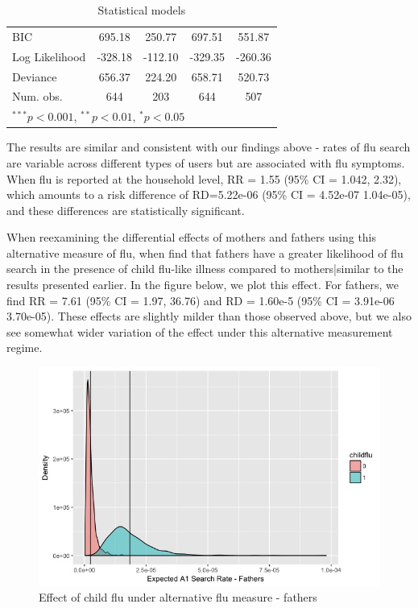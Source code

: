 \documentclass[12pt]{article}
\begin{document}
\begin{table}[h!]
\begin{center}
\begin{tabular}{l c c c c }
BIC            & 695.18         & 250.77         & 697.51         & 551.87         \\
Log Likelihood & -328.18        & -112.10        & -329.35        & -260.36        \\
Deviance       & 656.37         & 224.20         & 658.71         & 520.73         \\
Num. obs.      & 644            & 203            & 644            & 507            \\
\hline
\multicolumn{5}{l}{\scriptsize{$^{***}p<0.001$, $^{**}p<0.01$, $^*p<0.05$}}
\end{tabular}
\caption{Statistical models}
\label{table:coefficients}
\end{center}
\end{table}

The results are similar and consistent with our findings above - rates of flu search are variable across different types of users but are associated with flu symptoms. When flu is reported at the household level, RR = 1.55 (95\% CI = 1.042, 2.32), which amounts to a risk difference of RD=5.22e-06 (95\% CI = 4.52e-07 1.04e-05), and these differences are statistically significant.   

When reexamining the differential effects of mothers and fathers using this alternative measure of flu, when find that fathers have a greater likelihood of flu search in the presence of child flu-like illness compared to mothers|similar to the results presented earlier. In the figure below, we plot this effect. For fathers, we find RR = 7.61 (95\% CI = 1.97, 36.76) and RD = 1.60e-5 (95\% CI = 3.91e-06 3.70e-05). These effects are slightly milder than those observed above, but we also see somewhat wider variation of the effect under this alternative measurement regime. %

\begin{figure}[!htbp]
\begin{centering}
   \includegraphics[width=.7\textwidth]{alternative_fathers}
  \caption{Effect of child flu under alternative flu measure - fathers}
\label{alt_fathers}
\end{centering}
\end{figure}
\end{document}
